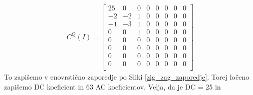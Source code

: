 \documentclass[a4paper,12pt,openright]{book}
\begin{document}
\begin{gather*}
 C^Q(I) =
  \begin{bmatrix}
 25&  0&  0&  0&  0&  0&  0&  0\\
 -2& -2&  1&  0&  0&  0&  0&  0\\
 -1& -3&  1&  0&  0&  0&  0&  0\\
  0&  0&  1&  0&  0&  0&  0&  0\\
  0&  0&  0&  0&  0&  0&  0&  0\\
  0&  0&  0&  0&  0&  0&  0&  0\\
  0&  0&  0&  0&  0&  0&  0&  0\\
  0&  0&  0&  0&  0&  0&  0&  0\\
   \end{bmatrix}
\end{gather*}
To zapišemo v enovrstično zaporedje po Sliki \ref{zig_zag_zaporedje}. Torej ločeno zapišemo DC koeficient in 63 AC koeficientov. Velja, da je DC = 25 in
\end{document}
